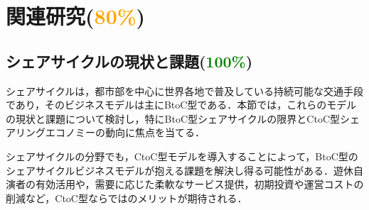 \section{関連研究(\textcolor{orange}{80\%})}
  \label{sec:関連研究}
    \par
  
  \subsection{シェアサイクルの現状と課題(\textcolor{green}{100\%})}
    \label{sec:シェアサイクルの現状と課題}
      \par シェアサイクルは，都市部を中心に世界各地で普及している持続可能な交通手段であり，そのビジネスモデルは主にBtoC型である．本節では，これらのモデルの現状と課題について検討し，特にBtoC型シェアサイクルの限界とCtoC型シェアリングエコノミーの動向に焦点を当てる．
      \par シェアサイクルの分野でも，CtoC型モデルを導入することによって，BtoC型のシェアサイクルビジネスモデルが抱える課題を解決し得る可能性がある．遊休自演者の有効活用や，需要に応じた柔軟なサービス提供，初期投資や運営コストの削減など，CtoC型ならではのメリットが期待される．
      

